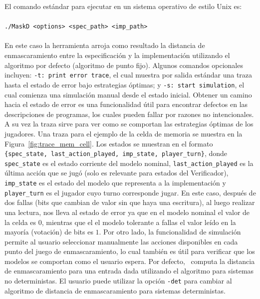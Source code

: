 El comando estándar para ejecutar {\MaskD} en un sistema operativo de estilo Unix es:
\\ 
\\
 \verb"./MaskD <options> <spec_path> <imp_path>"
\\
\\
En este caso la herramienta arroja como resultado la distancia de enmascaramiento entre la especificación y la implementación utilizando el algoritmo por defecto (algoritmo de punto fijo).
Algunos comandos opcionales incluyen: \verb"-t: print error trace", el cual muestra por salida estándar una traza hasta el estado de error bajo estrategias óptimas; y  \verb"-s: start simulation", el cual comienza una simulación manual desde el estado inicial.  
Obtener un camino hacia el estado de error es una funcionalidad útil para encontrar defectos en las descripciones de programas, los cuales pueden fallar por razones no intencionales. A su vez la traza sirve para ver como se comportan las estrategias óptimas de los jugadores. Una traza para el ejemplo de la celda de memoria se muestra en la Figura~\ref{fig:trace_mem_cell}. Los estados se muestran en el formato \verb"{spec_state, last_action_played, imp_state, player_turn}", donde \verb"spec_state" es el estado corriente del modelo nominal, \verb"last_action_played" es la última acción que se jugó (solo es relevante para estados del Verificador), \verb"imp_state" es el estado del modelo que representa a la implementación y \verb"player_turn" es el jugador cuyo turno corresponde jugar. En este caso, después de dos fallas (bits que cambian de valor sin que haya una escritura), al luego realizar una lectura, nos lleva al estado de error ya que en el modelo nominal el valor de la celda es $0$, mientras que el el modelo tolerante a fallas el valor leído en la mayoría (votación) de bits es $1$. Por otro lado, la funcionalidad de simulación permite al usuario seleccionar manualmente las acciones disponibles en cada punto del juego de enmascaramiento, lo cual también es útil para verificar que los modelos se comportan como el usuario espera.
Por defecto, \MaskD~computa la distancia de enmascaramiento para una entrada dada utilizando el algoritmo para sistemas no deterministas. 
El usuario puede utilizar la opción \verb"-det" para cambiar al algoritmo de distancia de enmascaramiento para sistemas deterministas.
